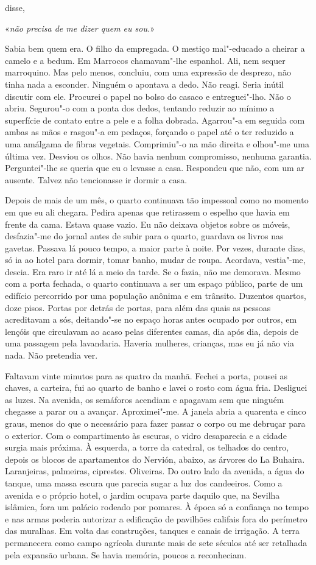 disse,

«\emph{não precisa de me dizer quem eu sou.}»

Sabia bem quem era. O filho da empregada. O mestiço mal"-educado a
cheirar a camelo e a bedum. Em Marrocos chamavam"-lhe espanhol. Ali, nem
sequer marroquino. Mas pelo menos, concluiu, com uma expressão de
desprezo, não tinha nada a esconder. Ninguém o apontava a dedo. Não
reagi. Seria inútil discutir com ele. Procurei o papel no bolso do
casaco e entreguei"-lho. Não o abriu. Segurou"-o com a ponta dos dedos,
tentando reduzir ao mínimo a superfície de contato entre a pele e a
folha dobrada. Agarrou"-a em seguida com ambas as mãos e rasgou"-a em
pedaços, forçando o papel até o ter reduzido a uma amálgama de fibras
vegetais. Comprimiu"-o na mão direita e olhou"-me uma última vez.
Desviou os olhos. Não havia nenhum compromisso, nenhuma garantia.
Perguntei"-lhe se queria que eu o levasse a casa. Respondeu que não, com
um ar ausente. Talvez não tencionasse ir dormir a casa.

Depois de mais de um mês, o quarto continuava tão impessoal como no
momento em que eu ali chegara. Pedira apenas que retirassem o espelho
que havia em frente da cama. Estava quase vazio. Eu não deixava objetos
sobre os móveis, desfazia"-me do jornal antes de subir para o quarto,
guardava os livros nas gavetas. Passava lá pouco tempo, a maior parte à
noite. Por vezes, durante dias, só ia ao hotel para dormir, tomar banho,
mudar de roupa. Acordava, vestia"-me, descia. Era raro ir até lá a meio
da tarde. Se o fazia, não me demorava. Mesmo com a porta fechada, o
quarto continuava a ser um espaço público, parte de um edifício
percorrido por uma população anônima e em trânsito. Duzentos quartos,
doze pisos. Portas por detrás de portas, para além das quais as pessoas
acreditavam a sós, deitando"-se no espaço horas antes ocupado por
outros, em lençóis que circulavam ao acaso pelas diferentes camas, dia
após dia, depois de uma passagem pela lavandaria. Haveria mulheres,
crianças, mas eu já não via nada. Não pretendia ver.

Faltavam vinte minutos para as quatro da manhã. Fechei a porta, pousei
as chaves, a carteira, fui ao quarto de banho e lavei o rosto com água
fria. Desliguei as luzes. Na avenida, os semáforos acendiam e apagavam
sem que ninguém chegasse a parar ou a avançar. Aproximei"-me. A janela
abria a quarenta e cinco graus, menos do que o necessário para fazer
passar o corpo ou me debruçar para o exterior. Com o compartimento às
escuras, o vidro desaparecia e a cidade surgia mais próxima. À esquerda,
a torre da catedral, os telhados do centro, depois os blocos de
apartamentos do Nervión, abaixo, as árvores do La Buhaira. Laranjeiras,
palmeiras, ciprestes. Oliveiras. Do outro lado da avenida, a água do
tanque, uma massa escura que parecia sugar a luz dos candeeiros. Como a
avenida e o próprio hotel, o jardim ocupava parte daquilo que, na
Sevilha islâmica, fora um palácio rodeado por pomares. À época só a
confiança no tempo e nas armas poderia autorizar a edificação de
pavilhões califais fora do perímetro das muralhas. Em volta das
construções, tanques e canais de irrigação. A terra permanecera como
campo agrícola durante mais de sete séculos até ser retalhada pela
expansão urbana. Se havia memória, poucos a reconheciam.

